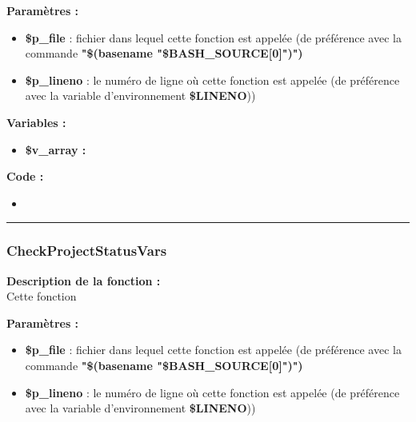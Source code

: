 \documentclass[a4paper,10pt]{article}
\begin{document}
\begin{justify}
    \textbf{Paramètres :}

    \begin{itemize}
        \item \color{orange}\textbf{\$p\_file}\color{white} : fichier dans lequel cette fonction est appelée (de préférence avec la commande \textbf{"\$(\color{gray}basename \color{white}"\color{orange}\$BASH\_SOURCE[0]\color{white}")")}\\

        \item \color{orange}\textbf{\$p\_lineno}\color{white} : le numéro de ligne où cette fonction est appelée (de préférence avec la variable d'environnement \textbf{\color{orange}\$LINENO}))
    \end{itemize}
\end{justify}

\begin{justify}
    \textbf{Variables :}

    \begin{itemize}
        \item \textbf{\color{orange}\$v\_array\color{white} :}
    \end{itemize}
\end{justify}

\begin{justify}
    \textbf{Code :}
    
    \begin{itemize}
        \item \textbf{}
    \end{itemize}
\end{justify}



\color{blue}\par\noindent\rule{\textwidth}{0.4pt}\color{white}

\color{blue}
\subsubsection{CheckProjectStatusVars}\color{white}

\begin{justify}
    \textbf{Description de la fonction :}\\
    Cette fonction
\end{justify}

\begin{justify}
    \textbf{Paramètres :}
    \begin{itemize}
        \item \color{orange}\textbf{\$p\_file}\color{white} : fichier dans lequel cette fonction est appelée (de préférence avec la commande \textbf{"\$(\color{gray}basename \color{white}"\color{orange}\$BASH\_SOURCE[0]\color{white}")")}\\

        \item \color{orange}\textbf{\$p\_lineno}\color{white} : le numéro de ligne où cette fonction est appelée (de préférence avec la variable d'environnement \textbf{\color{orange}\$LINENO}))
    \end{itemize}
\end{justify}
\end{document}
